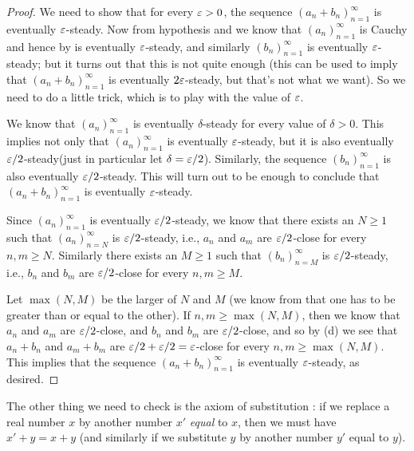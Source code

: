 \begin{proof}
We need to show that for every \(\varepsilon > 0\), the sequence \((a_n + b_n)_{n = 1}^{\infty}\) is eventually \(\varepsilon\)-steady.
Now from hypothesis and  we know that \((a_n)_{n = 1}^{\infty}\) is Cauchy and hence by  is eventually \(\varepsilon\)-steady, and similarly \((b_n)_{n = 1}^{\infty}\) is eventually \(\varepsilon\)-steady;
but it turns out that this is not quite enough
(this can be used to imply that \((a_n + b_n)_{n = 1}^{\infty}\) is eventually \(2\varepsilon\)-steady, but that's not what we want).
So we need to do a little trick, which is to play with the value of \(\varepsilon\).

We know that \((a_n)_{n = 1}^{\infty}\) is eventually \(\delta\)-steady for every value of \(\delta > 0\).
This implies not only that \((a_n)_{n = 1}^{\infty}\) is eventually \(\varepsilon\)-steady, but it is also eventually \(\varepsilon / 2\)-steady(just in particular let \(\delta = \varepsilon/2\)).
Similarly, the sequence \((b_n)_{n = 1}^{\infty}\) is also eventually \(\varepsilon / 2\)-steady.
This will turn out to be enough to conclude that \((a_n + b_n)_{n = 1}^{\infty}\) is eventually \(\varepsilon\)-steady.

Since \((a_n)_{n = 1}^{\infty}\) is eventually \(\varepsilon / 2\)-steady, we know that there exists an \(N \geq 1\) such that \((a_n)_{n = N}^{\infty}\) is \(\varepsilon / 2\)-steady, i.e., \(a_n\) and \(a_m\) are \(\varepsilon / 2\)-close for every \(n, m \geq N\).
Similarly there exists an \(M \geq 1\) such that \((b_n)_{n = M}^{\infty}\) is \(\varepsilon / 2\)-steady, i.e., \(b_n\) and \(b_m\) are \(\varepsilon / 2\)-close for every \(n, m \geq M\).

Let \(\max(N, M)\) be the larger of \(N\) and \(M\)
(we know from  that one has to be greater than or equal to the other).
If \(n, m \geq \max(N, M)\), then we know that \(a_n\) and \(a_m\) are \(\varepsilon / 2\)-close, and \(b_n\) and \(b_m\) are \(\varepsilon / 2\)-close, and so by (d) we see that \(a_n + b_n\) and \(a_m + b_m\) are \(\varepsilon/2 + \varepsilon/2 = \varepsilon\)-close for every \(n, m \geq \max(N, M)\).
This implies that the sequence \((a_n + b_n)_{n = 1}^{\infty}\) is eventually \(\varepsilon\)-steady, as desired.
\end{proof}

The other thing we need to check is the axiom of substitution :
if we replace a real number \(x\) by another number \(x'\) \emph{equal} to \(x\),  then we must have \(x' + y = x + y\)
(and similarly if we substitute \(y\) by another number \(y'\) equal to \(y\)).

